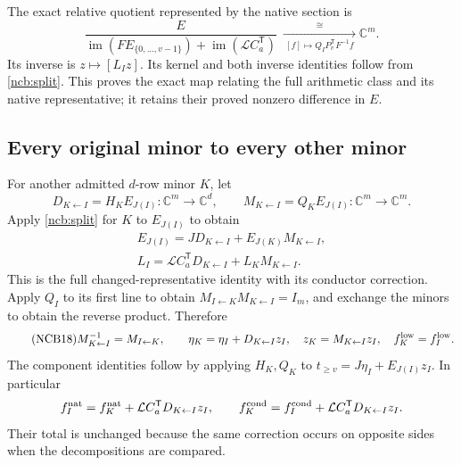 The exact relative quotient represented by the native section is
\begin{equation}\tag{NCB15}\label{ncb:relative}
\frac{E}
 {\operatorname{im}(FE_{\{0,\ldots,v-1\}})
          +\operatorname{im}(\mathcal LC_a^{\mathsf T})}
\ \xrightarrow[\ [f]\mapsto Q_IP_v^{\mathsf T}F^{-1}f\ ]{\ \cong\ }
\mathbb C^m .
\end{equation}
Its inverse is $z\mapsto[L_Iz]$. Its kernel and both inverse identities
follow from \eqref{ncb:split}. This proves the exact map relating the
full arithmetic class and its native representative; it retains their
proved nonzero difference in $E$.

\subsection{Every original minor to every other minor}
For another admitted $d$-row minor $K$, let
\begin{equation}\tag{NCB16}\label{ncb:transition}
D_{K\leftarrow I}=H_KE_{J(I)}:\mathbb C^m\to\mathbb C^d,\qquad
M_{K\leftarrow I}=Q_KE_{J(I)}:\mathbb C^m\to\mathbb C^m .
\end{equation}
Apply \eqref{ncb:split} for $K$ to $E_{J(I)}$ to obtain
\begin{equation}\tag{NCB17}\label{ncb:section-transition}
\begin{gathered}
E_{J(I)}=JD_{K\leftarrow I}
              +E_{J(K)}M_{K\leftarrow I},\\
L_I=\mathcal LC_a^{\mathsf T}D_{K\leftarrow I}
              +L_KM_{K\leftarrow I}.
\end{gathered}
\end{equation}
This is the full changed-representative identity with its conductor
correction. Apply $Q_I$ to its first line to obtain
$M_{I\leftarrow K}M_{K\leftarrow I}=I_m$, and exchange the minors
to obtain the reverse product. Therefore
\begin{equation}\tag{NCB18}\label{ncb:inverse}
M_{K\leftarrow I}^{-1}=M_{I\leftarrow K},\qquad
\eta_K=\eta_I+D_{K\leftarrow I}z_I,\quad
z_K=M_{K\leftarrow I}z_I,\quad
f_K^{\rm low}=f_I^{\rm low}.
\end{equation}
The component identities follow by applying $H_K,Q_K$ to
$t_{\geq v}=J\eta_I+E_{J(I)}z_I$. In particular
\[
f_I^{\rm nat}=f_K^{\rm nat}
       +\mathcal LC_a^{\mathsf T}D_{K\leftarrow I}z_I,\qquad
f_K^{\rm cond}=f_I^{\rm cond}
       +\mathcal LC_a^{\mathsf T}D_{K\leftarrow I}z_I.
\]
Their total is unchanged because the same correction occurs on
opposite sides when the decompositions are compared.

